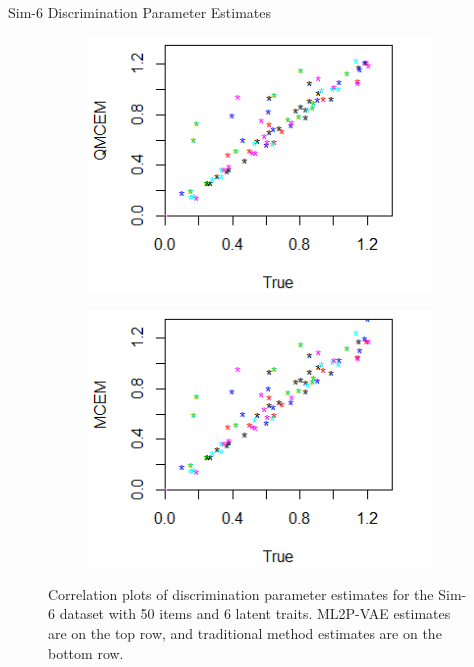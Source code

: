 \documentclass{beamer}
\theoremstyle{definition}
\begin{document}
\begin{frame}{Sim-6 Discrimination Parameter Estimates}
\begin{figure}[h]
\begin{subfigure}{.32\textwidth}
      \includegraphics[width=.9\linewidth]{../img/ml_journal_results/6skills/qmcem_disc_6skills.png}
    \end{subfigure}
    \begin{subfigure}{.32\textwidth}
      \centering
      \includegraphics[width=.9\linewidth]{../img/ml_journal_results/6skills/mcem_disc_6skills.png}
    \end{subfigure}
    \caption{Correlation plots of discrimination parameter estimates for the Sim-6 dataset with 50 items and 6 latent traits. ML2P-VAE estimates are on the top row, and traditional method estimates are on the bottom row.}
    \label{fig:6skill_cor}
\end{figure}
\end{frame}
\end{document}
